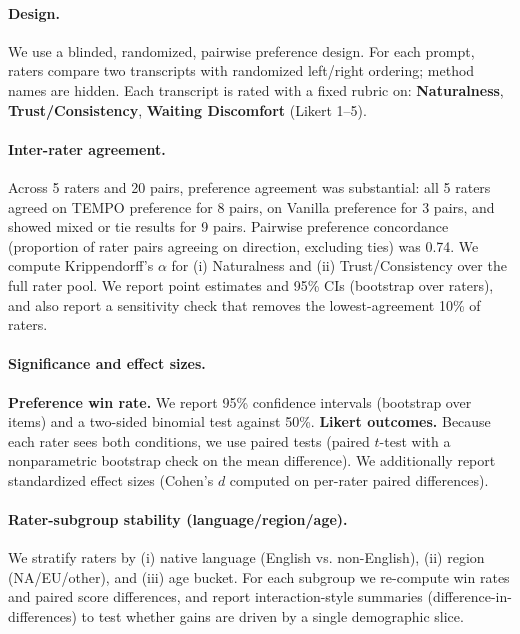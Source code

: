 \documentclass[11pt]{article}
\begin{document}
\paragraph{Design.}
We use a blinded, randomized, pairwise preference design. For each prompt, raters compare two transcripts with randomized left/right ordering; method names are hidden. Each transcript is rated with a fixed rubric on:
\textbf{Naturalness}, \textbf{Trust/Consistency}, \textbf{Waiting Discomfort} (Likert 1--5).

\paragraph{Inter-rater agreement.}
Across 5 raters and 20 pairs, preference agreement was substantial: all 5 raters agreed on TEMPO preference for 8 pairs, on Vanilla preference for 3 pairs, and showed mixed or tie results for 9 pairs. Pairwise preference concordance (proportion of rater pairs agreeing on direction, excluding ties) was 0.74.
We compute Krippendorff's $\alpha$ for (i) Naturalness and (ii) Trust/Consistency over the full rater pool.
We report point estimates and 95\% CIs (bootstrap over raters), and also report a sensitivity check that removes the lowest-agreement 10\% of raters.

\paragraph{Significance and effect sizes.}
\textbf{Preference win rate.} We report 95\% confidence intervals (bootstrap over items) and a two-sided binomial test against 50\%.
\textbf{Likert outcomes.} Because each rater sees both conditions, we use paired tests (paired $t$-test with a nonparametric bootstrap check on the mean difference).
We additionally report standardized effect sizes (Cohen's $d$ computed on per-rater paired differences).

\paragraph{Rater-subgroup stability (language/region/age).}
We stratify raters by (i) native language (English vs. non-English), (ii) region (NA/EU/other), and (iii) age bucket.
For each subgroup we re-compute win rates and paired score differences, and report interaction-style summaries (difference-in-differences) to test whether gains are driven by a single demographic slice.
\end{document}
